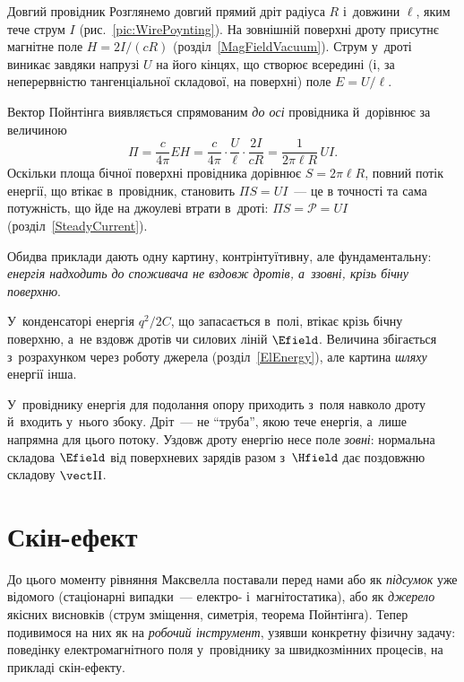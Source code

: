 \begin{Example}{Довгий провідник}
	Розглянемо довгий прямий дріт радіуса $R$ і~довжини $\ell$, яким тече струм $I$ (рис.~\ref{pic:WirePoynting}).
	На зовнішній поверхні дроту присутнє магнітне поле $H = 2I/(cR)$
	(розділ~\ref{MagFieldVacuum}). Струм у~дроті виникає завдяки напрузі $U$ на його
	кінцях, що створює всередині (і, за неперервністю тангенціальної складової, на
	поверхні) поле $E = U/\ell$.

	Вектор Пойнтінга виявляється спрямованим \emph{до осі} провідника й~дорівнює за
	величиною
	\begin{equation*}
		\Pi = \frac{c}{4\pi}EH = \frac{c}{4\pi}\cdot\frac{U}{\ell}\cdot\frac{2I}{cR} = \frac1{2\pi\ell R}\,UI.
	\end{equation*}
	Оскільки площа бічної поверхні провідника дорівнює $S=2\pi\ell R$, повний потік
	енергії, що втікає в~провідник, становить $\Pi S = UI$~--- це в точності та сама
	потужність, що йде на джоулеві втрати в~дроті: $\Pi S = \mathcal P = UI$
	(розділ~\ref{SteadyCurrent}).
\end{Example}



Обидва приклади дають одну картину, контрінтуїтивну, але фундаментальну: \emph{енергія надходить до споживача не вздовж дротів, а~ззовні, крізь бічну поверхню}.

У~конденсаторі енергія $q^2/2C$, що запасається в~полі, втікає крізь бічну поверхню, а~не вздовж дротів чи силових ліній $\Efield$. Величина збігається з~розрахунком через роботу джерела (розділ~\ref{ElEnergy}), але картина \emph{шляху} енергії інша.

У~провіднику енергія для подолання опору приходить з~поля навколо дроту й~входить у~нього збоку. Дріт~--- не \enquote{труба}, якою тече енергія, а~лише напрямна для цього потоку. Уздовж дроту енергію несе поле \emph{зовні}: нормальна складова $\Efield$ від поверхневих зарядів разом з~$\Hfield$ дає поздовжню складову $\vect\Pi$.


\section{Скін-ефект}\hypertarget{skin-effect}{}


До цього моменту рівняння Максвелла поставали перед нами або як \emph{підсумок} уже
відомого (стаціонарні випадки~--- електро- і~магнітостатика), або як \emph{джерело}
якісних висновків (струм зміщення, симетрія, теорема Пойнтінга). Тепер подивимося на них
як на \emph{робочий інструмент}, узявши конкретну фізичну задачу: поведінку
електромагнітного поля у~провіднику за швидкозмінних процесів, на прикладі скін-ефекту.


